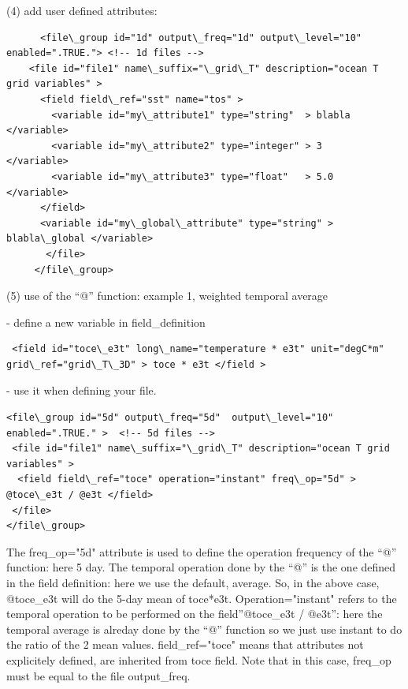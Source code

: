 (4) add user defined attributes:

\vspace{-20pt}
\begin{alltt}  {{\scriptsize    
\begin{verbatim}
      <file\_group id="1d" output\_freq="1d" output\_level="10" enabled=".TRUE."> <!-- 1d files --> 
	<file id="file1" name\_suffix="\_grid\_T" description="ocean T grid variables" >
	  <field field\_ref="sst" name="tos" >
	    <variable id="my\_attribute1" type="string"  > blabla </variable>
	    <variable id="my\_attribute2" type="integer" > 3      </variable>
	    <variable id="my\_attribute3" type="float"   > 5.0    </variable>
	  </field>
	  <variable id="my\_global\_attribute" type="string" > blabla\_global </variable>
       </file>
     </file\_group> 
\end{verbatim}
}}\end{alltt} 

(5) use of the ``@'' function: example 1, weighted temporal average

 - define a new variable in field\_definition
\vspace{-20pt}
\begin{alltt}  {{\scriptsize    
\begin{verbatim}
 <field id="toce\_e3t" long\_name="temperature * e3t" unit="degC*m" grid\_ref="grid\_T\_3D" > toce * e3t </field >
\end{verbatim}
}}\end{alltt}
 - use it when defining your file.  
\vspace{-20pt}
\begin{alltt}  {{\scriptsize    
\begin{verbatim}
<file\_group id="5d" output\_freq="5d"  output\_level="10" enabled=".TRUE." >  <!-- 5d files -->  
 <file id="file1" name\_suffix="\_grid\_T" description="ocean T grid variables" >
  <field field\_ref="toce" operation="instant" freq\_op="5d" > @toce\_e3t / @e3t </field>
 </file>
</file\_group> 
\end{verbatim}
}}\end{alltt}
The freq\_op="5d" attribute is used to define the operation frequency of the ``@'' function: here 5 day. The temporal operation done by the ``@'' is the one defined in the field definition: here we use the default, average. So, in the above case, @toce\_e3t will do the 5-day mean of toce*e3t. Operation="instant" refers to the temporal operation to be performed on the field''@toce\_e3t / @e3t'': here the temporal average is alreday done by the ``@'' function so we just use instant to do the ratio of the 2 mean values. field\_ref="toce" means that attributes not explicitely defined, are inherited from toce field. Note that in this case, freq\_op must be equal to the file output\_freq.

